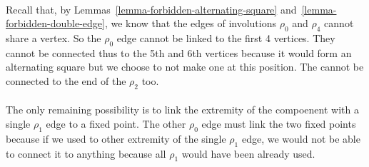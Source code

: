 \paragraph{}
Recall that, by Lemmas~\ref{lemma-forbidden-alternating-square} and~\ref{lemma-forbidden-double-edge}, we know that the edges of involutions $\rho_0$ and $\rho_4$ cannot share a vertex. So the $\rho_0$ edge cannot be linked to the first 4 vertices. They cannot be connected thus to the 5th and 6th vertices because it would form an alternating square but we choose to not make one at this position. The cannot be connected to the end of the $\rho_2$ too.

\paragraph{}
The only remaining possibility is to link the extremity of the compoenent with a single $\rho_1$ edge to a fixed point. The other $\rho_0$ edge must link the two fixed points because if we used to other extremity of the single $\rho_1$ edge, we would not be able to connect it to anything because all $\rho_1$ would have been already used.

\begin{figure}[H]
  \begin{center}
    \caption{}
  \end{center}
\end{figure}

